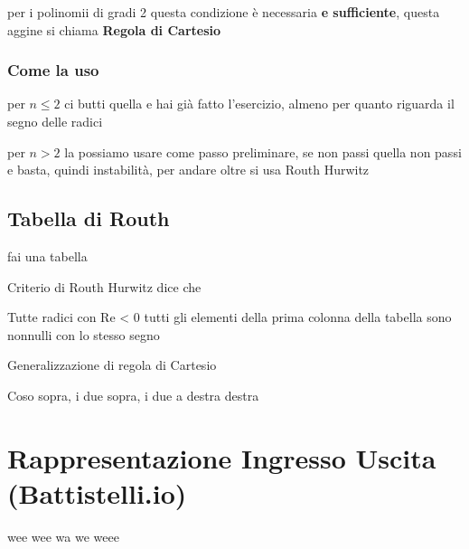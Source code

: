 \documentclass[11pt]{article}
\begin{document}
per i polinomii di gradi 2 questa condizione è necessaria \textbf{e sufficiente},
questa \iff aggine si chiama \textbf{Regola di Cartesio}

\subsubsection{Come la uso}
\label{sec:org509b6f0}

per \(n \leq 2\) ci butti quella e hai già fatto l'esercizio, almeno per quanto
riguarda il segno delle radici

per \(n > 2\) la possiamo usare come passo preliminare, se non passi quella non
passi e basta, quindi instabilità, per andare oltre si usa Routh Hurwitz

\subsection{Tabella di Routh}
\label{sec:org366ac0b}

fai una tabella

Criterio di Routh Hurwitz dice che

Tutte radici con Re < 0 \iff tutti gli elementi della prima colonna della
tabella sono nonnulli con lo stesso segno

Generalizzazione di regola di Cartesio

Coso sopra, i due sopra, i due a destra destra

\section{Rappresentazione Ingresso Uscita (Battistelli.io)}
\label{sec:org58cfd75}

wee wee wa we weee
\end{document}
